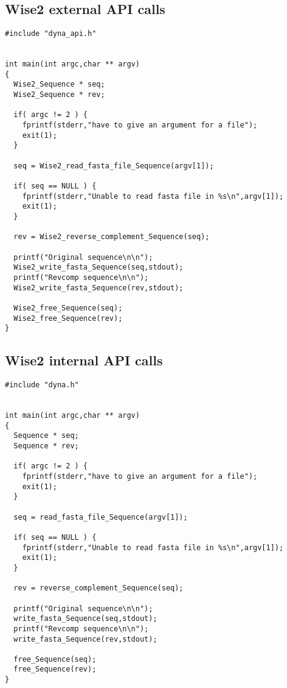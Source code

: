 \subsection{Wise2 external API calls}

\begin{verbatim}
#include "dyna_api.h"


int main(int argc,char ** argv)
{
  Wise2_Sequence * seq;
  Wise2_Sequence * rev;

  if( argc != 2 ) {
    fprintf(stderr,"have to give an argument for a file");
    exit(1);
  }

  seq = Wise2_read_fasta_file_Sequence(argv[1]);

  if( seq == NULL ) {
    fprintf(stderr,"Unable to read fasta file in %s\n",argv[1]);
    exit(1);
  }
  
  rev = Wise2_reverse_complement_Sequence(seq);

  printf("Original sequence\n\n");
  Wise2_write_fasta_Sequence(seq,stdout);
  printf("Revcomp sequence\n\n");
  Wise2_write_fasta_Sequence(rev,stdout);
 
  Wise2_free_Sequence(seq);
  Wise2_free_Sequence(rev);
}

\end{verbatim}

\subsection{Wise2 internal API calls}

\begin{verbatim}
#include "dyna.h"


int main(int argc,char ** argv)
{
  Sequence * seq;
  Sequence * rev;

  if( argc != 2 ) {
    fprintf(stderr,"have to give an argument for a file");
    exit(1);
  }

  seq = read_fasta_file_Sequence(argv[1]);

  if( seq == NULL ) {
    fprintf(stderr,"Unable to read fasta file in %s\n",argv[1]);
    exit(1);
  }
  
  rev = reverse_complement_Sequence(seq);

  printf("Original sequence\n\n");
  write_fasta_Sequence(seq,stdout);
  printf("Revcomp sequence\n\n");
  write_fasta_Sequence(rev,stdout);
 
  free_Sequence(seq);
  free_Sequence(rev);
}

\end{verbatim}

